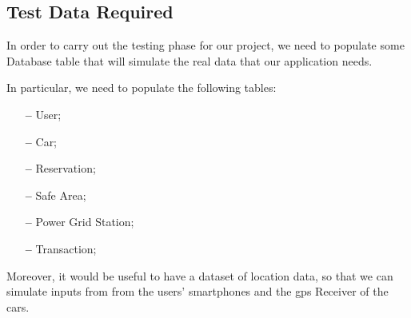 \subsection{Test Data Required}

In order to carry out the testing phase for our project, we need to populate some Database table that will simulate the real data that our application needs.
\newline

In particular, we need to populate the following tables:

\begin{itemize}

\item[\textbf{--}] User;
\item[\textbf{--}] Car;
\item[\textbf{--}] Reservation;
\item[\textbf{--}] Safe Area;
\item[\textbf{--}] Power Grid Station;
\item[\textbf{--}] Transaction;

\end{itemize}

Moreover, it would be useful to have a dataset of location data, so that we can simulate inputs from from the users' smartphones and the \acs{gps} Receiver of the cars.